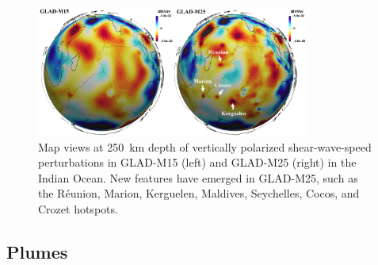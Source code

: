 \documentclass[extra,mreferee]{gji}
\begin{document}
\begin{figure}
  \centering
  \includegraphics[width=0.8\textwidth]{figures/M25-Reunion.pdf}
  \caption{\small{Map views at 250~km depth of vertically polarized shear-wave-speed perturbations in GLAD-M15 (left) and GLAD-M25 (right) in the Indian Ocean. New features have emerged in GLAD-M25, such as the R\'eunion, Marion, Kerguelen, Maldives, Seychelles, Cocos, and Crozet hotspots.}
  }
  \label{fig:M24-Reunion}
\end{figure}

\subsection{Plumes}
\label{section:plumes}
\end{document}
